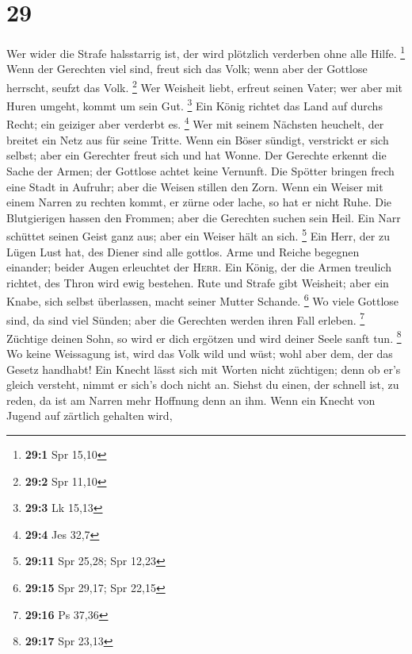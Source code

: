 \hypertarget{section-13}{%
\section{29}\label{section-13}}

 Wer wider die Strafe halsstarrig ist, der wird plötzlich
verderben ohne alle Hilfe. \footnote{\textbf{29:1} Spr 15,10}
 Wenn der Gerechten viel sind, freut sich das Volk; wenn
aber der Gottlose herrscht, seufzt das Volk. \footnote{\textbf{29:2} Spr
  11,10}  Wer Weisheit liebt, erfreut seinen Vater; wer
aber mit Huren umgeht, kommt um sein Gut. \footnote{\textbf{29:3} Lk
  15,13}  Ein König richtet das Land auf durchs Recht; ein
geiziger aber verderbt es. \footnote{\textbf{29:4} Jes 32,7}
 Wer mit seinem Nächsten heuchelt, der breitet ein Netz
aus für seine Tritte.  Wenn ein Böser sündigt, verstrickt
er sich selbst; aber ein Gerechter freut sich und hat Wonne.
 Der Gerechte erkennt die Sache der Armen; der Gottlose
achtet keine Vernunft.  Die Spötter bringen frech eine
Stadt in Aufruhr; aber die Weisen stillen den Zorn.  Wenn
ein Weiser mit einem Narren zu rechten kommt, er zürne oder lache, so
hat er nicht Ruhe.  Die Blutgierigen hassen den Frommen;
aber die Gerechten suchen sein Heil.  Ein Narr schüttet
seinen Geist ganz aus; aber ein Weiser hält an sich. \footnote{\textbf{29:11}
  Spr 25,28; Spr 12,23}  Ein Herr, der zu Lügen Lust hat,
des Diener sind alle gottlos.  Arme und Reiche begegnen
einander; beider Augen erleuchtet der \textsc{Herr}.  Ein
König, der die Armen treulich richtet, des Thron wird ewig bestehen.
 Rute und Strafe gibt Weisheit; aber ein Knabe, sich
selbst überlassen, macht seiner Mutter Schande. \footnote{\textbf{29:15}
  Spr 29,17; Spr 22,15}  Wo viele Gottlose sind, da sind
viel Sünden; aber die Gerechten werden ihren Fall erleben. \footnote{\textbf{29:16}
  Ps 37,36}  Züchtige deinen Sohn, so wird er dich
ergötzen und wird deiner Seele sanft tun. \footnote{\textbf{29:17} Spr
  23,13}  Wo keine Weissagung ist, wird das Volk wild und
wüst; wohl aber dem, der das Gesetz handhabt!  Ein Knecht
lässt sich mit Worten nicht züchtigen; denn ob er's gleich versteht,
nimmt er sich's doch nicht an.  Siehst du einen, der
schnell ist, zu reden, da ist am Narren mehr Hoffnung denn an ihm.
 Wenn ein Knecht von Jugend auf zärtlich gehalten wird,
